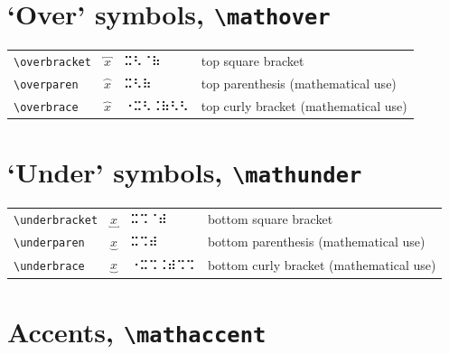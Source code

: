 \documentclass[oneside]{article}
\begin{document}
\section{‘Over’ symbols, \texttt{\textbackslash{}mathover}}

\begin{longtable}{llll}
\verb|\overbracket| & $\overbracket{x}$ &  ⠭⠣⠈⠷  & {top square bracket} \\[2ex]
\verb|\overparen| & $\overparen{x}$ &  ⠭⠣⠷  & {top parenthesis (mathematical use)} \\[2ex]
\verb|\overbrace| & $\overbrace{x}$ &  ⠐⠭⠣⠨⠷⠣⠣  & {top curly bracket (mathematical use)} \\[2ex]
\end{longtable}


\section{‘Under’ symbols, \texttt{\textbackslash{}mathunder}}

\begin{longtable}{llll}
\verb|\underbracket| & $\underbracket{x}$ & ⠭⠩⠈⠾  & {bottom square bracket} \\[2ex]
\verb|\underparen| & $\underparen{x}$ &  ⠭⠩⠾  & {bottom parenthesis (mathematical use)} \\[2ex]
\verb|\underbrace| & $\underbrace{x}$ &  ⠐⠭⠩⠨⠾⠩⠩  & {bottom curly bracket (mathematical use)} \\[2ex]
\end{longtable}


\clearpage

\section{Accents, \texttt{\textbackslash{}mathaccent}}
\end{document}
